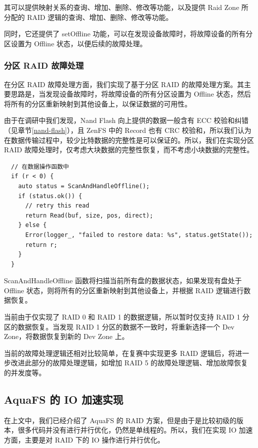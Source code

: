其可以提供映射关系的查询、增加、删除、修改等功能，以及提供 Raid Zone 所分配的 RAID 逻辑的查询、增加、删除、修改等功能。

同时，它还提供了 setOffline 功能，可以在发现设备故障时，将故障设备的所有分区设置为 Offline 状态，以便后续的故障处理。

\subsubsection{分区 RAID 故障处理}

在分区 RAID 故障处理方面，我们实现了基于分区 RAID 的故障处理方案。其主要思路是，当发现设备故障时，将故障设备的所有分区设置为 Offline 状态，然后将所有的分区重新映射到其他设备上，以保证数据的可用性。

由于在调研中我们发现，Nand Flash 向上提供的数据一般含有 ECC 校验和纠错（见章节\ref{nand-flash}），且 ZenFS 中的 Record 也有 CRC 校验和，所以我们认为在数据传输过程中，较少比特数据的完整性是可以保证的\cite{schroeder_flash_nodate}。所以，我们在实现分区 RAID 故障处理时，仅考虑大块数据的完整性恢复，而不考虑小块数据的完整性。

\begin{lstlisting}
  // 在数据操作函数中
  if (r < 0) {
    auto status = ScanAndHandleOffline();
    if (status.ok()) {
      // retry this read
      return Read(buf, size, pos, direct);
    } else {
      Error(logger_, "failed to restore data: %s", status.getState());
      return r;
    }
  }
\end{lstlisting}

ScanAndHandleOffline 函数将扫描当前所有盘的数据状态，如果发现有盘处于 Offline 状态，则将所有的分区重新映射到其他设备上，并根据 RAID 逻辑进行数据恢复。

当前由于仅实现了 RAID 0 和 RAID 1 的数据逻辑，所以暂时仅支持 RAID 1 分区的数据恢复。当发现 RAID 1 分区的数据不一致时，将重新选择一个 Dev Zone，将数据恢复到新的 Dev Zone 上。

当前的故障处理逻辑还相对比较简单，在复赛中实现更多 RAID 逻辑后，将进一步改进此部分的故障处理逻辑，如增加 RAID 5 的故障处理逻辑、增加故障恢复的并发度等。

\subsection{AquaFS 的 IO 加速实现}

在上文中，我们已经介绍了 AquaFS 的 RAID 方案，但是由于是比较初级的版本，很多代码并没有进行并行优化，仍然是单线程的。所以，我们在实现 IO 加速方面，主要是对 RAID 下的 IO 操作进行并行优化。

